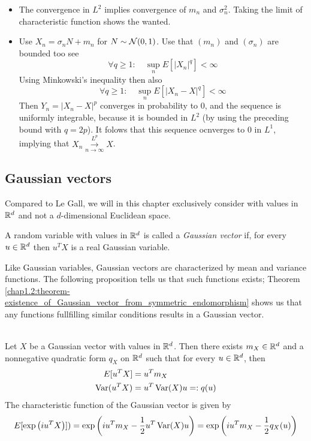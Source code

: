 \begin{proofidea}
\begin{itemize}[(i)]
\item The convergence in $L^2$ implies convergence of $m_n$ and $\sigma_n^2$. Taking the limit of characteristic function shows the wanted.
\item Use $X_n=\sigma_nN+m_n$ for $N \sim \mathcal{N}(0,1)$. Use that $(m_n)$ and $(\sigma_n)$ are bounded too see
$$\forall q \geq 1: \quad \sup_nE[|X_n|^q]< \infty$$
Using Minkowski's inequality then also
$$\forall q \geq 1: \quad \sup_nE[|X_n-X|^q]< \infty$$
Then $Y_n=|X_n-X|^p$ converges in probability to 0, and the sequence is uniformly integrable, because it is bounded in $L^2$ (by using the preceding bound with $q = 2p$). It folows that this sequence ocnverges to 0 in $L^1$, implying that $X_n\overset{L^p}{\underset{n \to \infty}{\to}}X$.
\end{itemize}
\end{proofidea}



\subsection{Gaussian vectors}
Compared to Le Gall, we will in this chapter exclusively consider with values in $\mathbb{R}^d$ and not a $d$-dimensional Euclidean space.
\begin{definition}\label{chap1.2:definition-gaussian_vector}
A random variable with values in $\mathbb{R}^d$ is called a \textit{Gaussian vector} if, for every $u \in \mathbb{R}^d$ then
$u^TX$ is a real Gaussian variable.
\end{definition}

Like Gaussian variables, Gaussian vectors are characterized by mean and variance functions. The following proposition tells us that such functions exists; Theorem \ref{chap1.2:theorem-existence_of_Gaussian_vector_from_symmetric_endomorphism} shows us that any functions fullfilling similar conditions results in a Gaussian vector.
\begin{proposition}[]
 \\
Let $X$ be a Gaussian vector with values in $\mathbb{R}^d$. Then there exists $m_X \in \mathbb{R}^d$ and a nonnegative quadratic form $q_X$ on $\mathbb{R}^d$ such that for every $u \in \mathbb{R}^d$, then
\begin{align}
E[u^TX]&=u^Tm_X \\
\operatorname{Var}(u^TX)&=u^T\operatorname{Var}(X)u=:q(u)
\end{align}
The characteristic function of the Gaussian vector is given by
$$E[\exp{\left(iu^TX\right)}])=\exp{\left(i u^Tm_X-\frac{1}{2}u^T\operatorname{Var}(X)u\right)}=\exp{\left(i u^Tm_X-\frac{1}{2}q_X(u)\right)}$$
\end{proposition}

